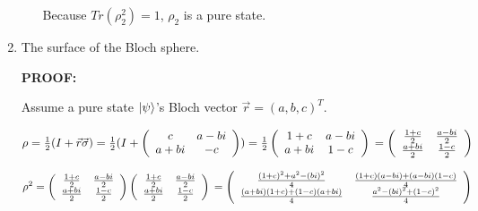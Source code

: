 \documentclass{article}
\begin{document}
\begin{enumerate}
\begin{enumerate}
                    Because $Tr(\rho_2^2)=1$, $\rho_2$ is a pure state.
          \end{enumerate}
    \item The surface of the Bloch sphere.

          \textbf{PROOF:}

          Assume a pure state $\ket{\psi}$'s Bloch vector $\vec{r}=(a,b,c)^T$.

          $\rho=\frac{1}{2}(I+\vec{r}\vec{\sigma})
              \\=\frac{1}{2}(I+\left(
              \begin{array}{cc}
                      c & a-bi \\a+bi&-c\\
                  \end{array}
              \right))
              \\=\frac{1}{2}\left(
              \begin{array}{cc}
                      1+c & a-bi \\a+bi&1-c\\
                  \end{array}
              \right)
              \\=\left(
              \begin{array}{cc}
                      \frac{1+c}{2} & \frac{a-bi}{2} \\\frac{a+bi}{2}&\frac{1-c}{2}\\
                  \end{array}
              \right)
          $

          $\rho^2=\left(
              \begin{array}{cc}
                      \frac{1+c}{2} & \frac{a-bi}{2} \\\frac{a+bi}{2}&\frac{1-c}{2}\\
                  \end{array}
              \right)\left(
              \begin{array}{cc}
                      \frac{1+c}{2} & \frac{a-bi}{2} \\\frac{a+bi}{2}&\frac{1-c}{2}\\
                  \end{array}
              \right)
              \\=\left(
              \begin{array}{cc}
                      \frac{(1+c)^2+a^2-(bi)^2}{4} & \frac{(1+c)(a-bi)+(a-bi)(1-c)}{4} \\\frac{(a+bi)(1+c)+(1-c)(a+bi)}{4}&\frac{a^2-(bi)^2+(1-c)^2}{4}\\
                  \end{array}
              \right)
          $


\end{enumerate}
\end{document}
